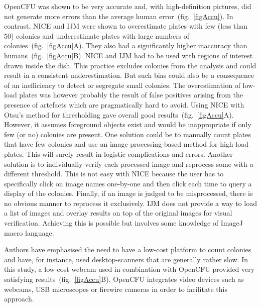 \documentclass[10pt]{article}
\newcommand{\IJM}{IJM}
\begin{document}
OpenCFU was shown to be very accurate and, with high-definition
pictures, did not generate more errors than the average human error~(fig.~\ref{figAccu}). In contrast, NICE and \IJM{} 
were shown to
overestimate plates with few (less than 50) colonies and underestimate plates
with large numbers 
of colonies~(fig.~\ref{figAccu}A). They also had a significantly
higher inaccuracy than humans~(fig.~\ref{figAccu}B). NICE and \IJM{} had to be
used with regions of interest drawn inside the dish. This practice excludes
colonies from the analysis and could result in a
consistent underestimation. But such bias could also be a consequence of an inefficiency to detect or segregate
 small colonies.
The overestimation of low-load plates was however probably the result of false positives
arising from the presence of artefacts which are pragmatically hard to avoid.
Using NICE with Otsu's method for thresholding gave overall good results~(fig.~\ref{figAccu}A).
However, it assumes foreground objects exist and would be inappropriate
if only few (or no) colonies are present. One
solution could be to manually count plates that have few colonies and use an
image processing-based method for high-load plates. This will surely result in
logistic complications and errors. Another solution is to individually verify
each processed image and reprocess some with a different threshold.
This is not easy with NICE because the user has to specifically click on image
names one-by-one and then click each time to query a display of the colonies.
Finally, if an image is judged to be misprocessed, there is no obvious manner to
reprocess it exclusively.
\IJM{}
does not provide a way to load a list of images and
overlay results on top of the original images for visual verification. Achieving
this is possible but involves some knowledge of ImageJ macro language.


Authors have emphasised the need to have a low-cost platform to count colonies
and have, for instance, used
desktop-scanners\cite{marotz_effective_2001,putman_simplified_2005,clarke_lowcost_2010,cai_optimized_2011
} that are generally rather slow. In this study, a low-cost webcam used in
combination with OpenCFU provided very satisfying results~(fig.~\ref{figAccu}B). OpenCFU integrates
video devices such as webcams, USB microscopes or firewire cameras in order to
facilitate this approach.
\end{document}
